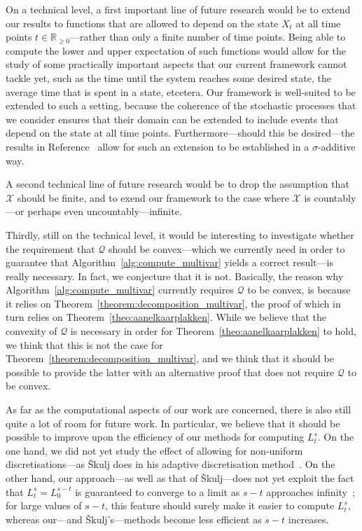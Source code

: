 \documentclass[10pt,a4paper]{paper}
\theoremstyle{definition}
\newcommand{\reals}{\mathbb{R}}
\newcommand{\realsnonneg}{\reals_{\geq 0}}
\newcommand{\states}{\mathcal{X}}
\newcommand{\rateset}{\mathcal{Q}}
\begin{document}
On a technical level, a first important line of future research would be to extend our results to functions that are allowed to depend on the state $X_t$ at all time points $t\in\realsnonneg$---rather than only a finite number of time points. Being able to compute the lower and upper expectation of such functions would allow for the study of some practically important aspects that our current framework cannot tackle yet, such as the time until the system reaches some desired state, the average time that is spent in a state, etcetera. 
Our framework is well-suited to be extended to such a setting, because the coherence of the stochastic processes that we consider ensures that their domain can be extended to include events that depend on the state at all time points. Furthermore---should this be desired---the results in Reference~\cite{berti2002coherent} allow for such an extension to be established in a $\sigma$-additive way. 

A second technical line of future research would be to drop the assumption that $\states$ should be finite, and to exend our framework to the case where $\states$ is countably---or perhaps even uncountably---infinite.

Thirdly, still on the technical level, it would be interesting to investigate whether the requirement that $\rateset$ should be convex---which we currently need in order to guarantee that Algorithm~\ref{alg:compute_multivar} yields a correct result---is really necessary. In fact, we conjecture that it is not. Basically, the reason why Algorithm~\ref{alg:compute_multivar} currently requires $\rateset$ to be convex, is because it relies on Theorem~\ref{theorem:decomposition_multivar}, the proof of which in turn relies on Theorem~\ref{theo:aanelkaarplakken}. While we believe that the convexity of $\rateset$ is necessary in order for Theorem~\ref{theo:aanelkaarplakken} to hold, we think that this is not the case for Theorem~\ref{theorem:decomposition_multivar}, and we think that it should be possible to provide the latter with an alternative proof that does not require $\rateset$ to be convex. 

As far as the computational aspects of our work are concerned, there is also still quite a lot of room for future work. In particular, we believe that it should be possible to improve upon the efficiency of our methods for computing $L_t^s$. On the one hand, we did not yet study the effect of allowing for non-uniform discretisations---as \v{S}kulj does in his adaptive discretisation method~\cite{Skulj:2015cq}. On the other hand, our approach---as well as that of \v{S}kulj---does not yet exploit the fact that $L_t^s=L_0^{s-t}$ is guaranteed to converge to a limit as $s-t$ approaches infinity~\cite{DeBock:2016}; for large values of $s-t$, this feature should surely make it easier to compute $L_t^s$, whereas our---and \v{S}kulj's---methods become less efficient as $s-t$ increases. 
\end{document}
